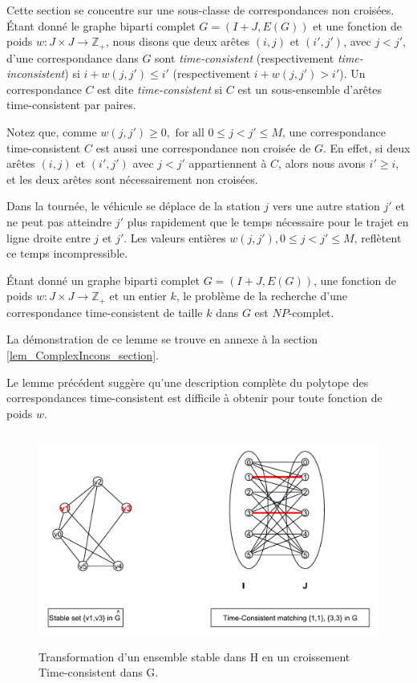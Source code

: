 {{Cette section se concentre sur une sous-classe de correspondances non croisées.
Étant donné le graphe biparti complet $G=(I+J, E(G))$ et une fonction de poids $w : J \times J \rightarrow \mathbb{Z}_+$, nous disons que deux arêtes $(i,j)$ et $(i',j')$, avec $j <j'$, d'une correspondance dans $G$ sont \emph{ time-consistent} (respectivement \emph{ time-inconsistent}) si   $i+w(j,j') \leq i'$ (respectivement $i+w(j,j') > i'$). Un correspondance $C$ est dite {\it time-consistent} si $C$ est un sous-ensemble d'arêtes time-consistent par paires.

Notez que, comme $w(j, j') \geq 0, \textrm{ for all } 0 \leq j < j' \leq M$,  une correspondance time-consistent $C$ est aussi une correspondance non croisée de $G$. 
En effet, si deux arêtes $(i,j)$ et $(i',j')$ avec $j<j'$ appartiennent à $C$, alors nous avons $i' \geq i$, et les deux arêtes sont nécessairement non croisées.

Dans la tournée, le véhicule se déplace de la station $j$ vers une autre station $j'$ et ne peut pas atteindre $j'$ plus rapidement que le temps nécessaire pour le trajet en ligne droite entre $j$ et $j'$.
Les valeurs entières $w(j, j'), 0 \leq j < j' \leq M$, reflètent ce temps incompressible. 

\begin{Lem}\label{lem_ComplexIncons}
	Étant donné un graphe biparti complet $G=(I+J, E(G))$, une fonction de poids $w : J \times J \rightarrow \mathbb{Z}_+$ et un entier $k$, 
	le problème de la recherche d'une correspondance time-consistent de taille $k$ dans $G$ est $NP$-complet.
\end{Lem}
La démonstration de ce lemme se trouve en annexe à la section \ref{lem_ComplexIncons_section}.

Le lemme précédent suggère qu'une description complète du polytope des correspondances time-consistent est difficile à obtenir pour toute fonction de poids $w$. 


\begin{figure}[H]
	\centerline{
		\includegraphics[height=7cm]{images_these/ConsistCompl.pdf}}
	\caption[Transformation d'un ensemble stable dans $H$ en un appariement conforme au temps dans G]{ Transformation d'un ensemble stable dans H en un croissement Time-consistent dans G.}
	\label{ConsistCompl}
\end{figure}

}}
